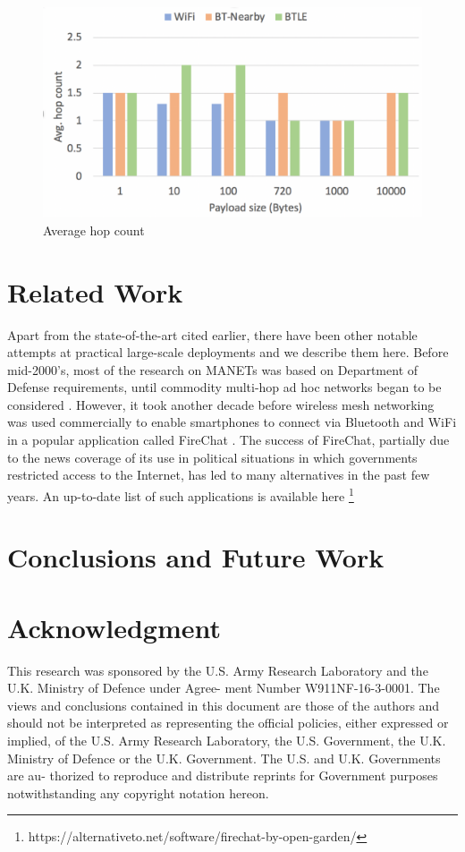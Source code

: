 \documentclass[conference]{IEEEtran}
\begin{document}
\begin{figure}[htbp]
\centerline{\includegraphics[width=\columnwidth]{figs/hops}}
\caption{Average hop count}
\label{fig:hop}
\end{figure}

%
\section{Related Work}
\label{sec:related}
%
Apart from the state-of-the-art cited earlier, there have been other
notable attempts at practical large-scale deployments and we describe
them here. Before mid-2000’s, most of the research on MANETs was based
on Department of Defense requirements, until commodity multi-hop ad
hoc networks began to be considered \cite{bruno-mesh-2005}. However,
it took another decade before wireless mesh networking was used
commercially to enable smartphones to connect via Bluetooth and WiFi
in a popular application called FireChat \cite{firechat}. The success
of FireChat, partially due to the news coverage of its use in
political situations in which governments restricted access to the
Internet, has led to many alternatives in the past few years. An
up-to-date list of such applications is available
here \footnote{https://alternativeto.net/software/firechat-by-open-garden/}
\section{Conclusions and Future Work}
\label{sec:conclude}

\section*{Acknowledgment}
This research was sponsored by the U.S. Army Research Laboratory and
the U.K. Ministry of Defence under Agree- ment Number
W911NF-16-3-0001. The views and conclusions contained in this document
are those of the authors and should not be interpreted as representing
the official policies, either expressed or implied, of the U.S. Army
Research Laboratory, the U.S. Government, the U.K. Ministry of Defence
or the U.K. Government. The U.S. and U.K. Governments are au- thorized
to reproduce and distribute reprints for Government purposes
notwithstanding any copyright notation hereon.
 
\end{document}
